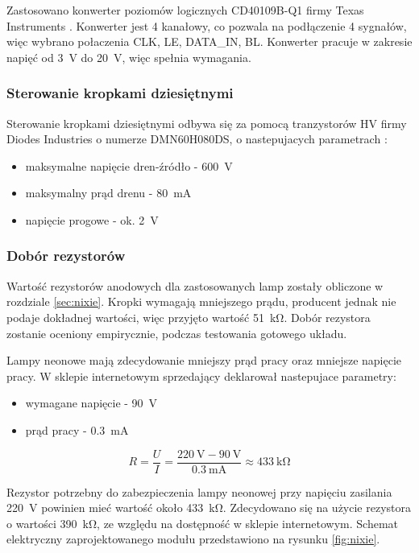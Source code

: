 \documentclass[../../main.tex]{subfiles}
\begin{document}
Zastosowano konwerter poziomów logicznych CD40109B-Q1 firmy Texas Instruments \cite{st:konwerter}.
Konwerter jest 4 kanałowy, co pozwala na podłączenie 4 sygnałów, więc wybrano połaczenia
CLK, LE, DATA\_IN, BL. Konwerter pracuje w zakresie napięć od \SI{3}{\volt} do \SI{20}{\volt}, więc spełnia wymagania.

\subsubsection{Sterowanie kropkami dziesiętnymi}
Sterowanie kropkami dziesiętnymi odbywa się za pomocą tranzystorów HV firmy Diodes Industries o numerze DMN60H080DS, 
o nastepujacych parametrach \cite{st:rejestry}:
\begin{itemize}
    \item maksymalne napięcie dren-źródło - \SI{600}{\volt}
    \item maksymalny prąd drenu - \SI{80}{\milli\ampere}
    \item napięcie progowe - ok. \SI{2}{\volt}
\end{itemize}

\subsubsection{Dobór rezystorów}
Wartość rezystorów anodowych dla zastosowanych lamp zostały obliczone w rozdziale \ref{sec:nixie}.
Kropki wymagają mniejszego prądu, producent jednak nie podaje dokładnej wartości, więc przyjęto wartość \SI{51}{\kilo\ohm}.
Dobór rezystora zostanie oceniony empirycznie, podczas testowania gotowego układu.

Lampy neonowe mają zdecydowanie mniejszy prąd pracy oraz mniejsze napięcie pracy. W sklepie internetowym sprzedający deklarował nastepujace parametry:
\begin{itemize}
    \item wymagane napięcie - \SI{90}{\volt}
    \item prąd pracy - \SI{0.3}{\milli\ampere}
\end{itemize}

\begin{equation}
    R = \frac{U}{I} = \frac{\SI{220}{\volt} - \SI{90}{\volt}}{ \SI{0.3}{\milli\ampere}} \approx \SI{433}{\kilo\ohm}
\end{equation}

Rezystor potrzebny do zabezpieczenia lampy neonowej przy napięciu zasilania \SI{220}{\volt} powinien mieć wartość około \SI{433}{\kilo\ohm}.
Zdecydowano się na użycie rezystora o wartości \SI{390}{\kilo\ohm}, ze względu na dostępność w sklepie internetowym. 
Schemat elektryczny zaprojektowanego modułu przedstawiono na rysunku \ref{fig:nixie}.
\end{document}
